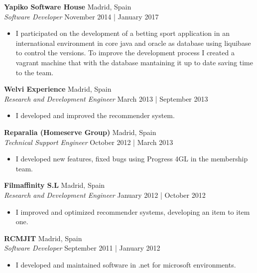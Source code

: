 \documentclass[a4paper]{article}
\begin{document}
\textbf{Yapiko Software House} \hfill Madrid, Spain\\
\textit{Software Developer} \hfill November 2014 | January 2017\\
\vspace{-1mm}
\begin{itemize} \itemsep 1pt
 	\item I participated on the development of a betting sport application in an international environment in core java and oracle as database using liquibase to control the versions. To improve the development process I created a vagrant machine that with the database mantaining it up to date saving time to the team.
\end{itemize}

\textbf{Welvi Experience} \hfill Madrid, Spain\\
\textit{Research and Development Engineer} \hfill March 2013 | September 2013\\
\vspace{-1mm}
\begin{itemize} \itemsep 1pt
	\item I developed and improved the recommender system.
\end{itemize}

\textbf{Reparalia (Homeserve Group)} \hfill Madrid, Spain\\
\textit{Technical Support Engineer} \hfill October 2012 | March 2013\\
\vspace{-1mm}
\begin{itemize} \itemsep 1pt
	\item I developed new features, fixed bugs using Progress 4GL in the membership team.
\end{itemize}

\textbf{Filmaffinity S.L} \hfill Madrid, Spain\\
\textit{Research and Development Engineer} \hfill January 2012 | October 2012\\
\vspace{-1mm}
\begin{itemize} \itemsep 1pt
	\item I improved and optimized recommender systems, developing an item to item one.
\end{itemize}

\textbf{RCMJIT} \hfill Madrid, Spain\\
\textit{Software Developer} \hfill September 2011 | January 2012\\
\vspace{-1mm}
\begin{itemize} \itemsep 1pt
	\item I developed and maintained software in .net for microsoft environments.
\end{itemize}
\end{document}

